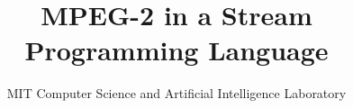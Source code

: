\documentclass[times,12pt,onecolumn]{article}
\title{MPEG-2 in a Stream Programming Language}
\author{
  MIT Computer Science and Artificial Intelligence Laboratory
}
\date{}
\begin{document}
\maketitle
\thispagestyle{empty}

\begin{abstract}

\end{abstract}





%


%





\end{document}
